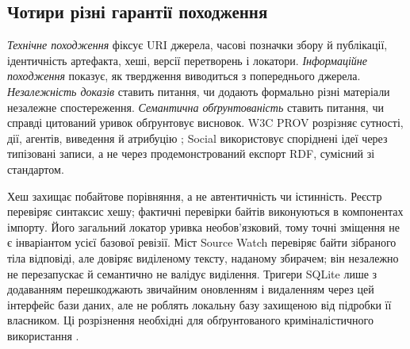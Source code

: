 \subsection{Чотири різні гарантії походження}
\emph{Технічне походження} фіксує URI джерела, часові позначки збору й публікації, ідентичність артефакта, хеші, версії перетворень і локатори. \emph{Інформаційне походження} показує, як твердження виводиться з попереднього джерела. \emph{Незалежність доказів} ставить питання, чи додають формально різні матеріали незалежне спостереження. \emph{Семантична обґрунтованість} ставить питання, чи справді цитований уривок обґрунтовує висновок. W3C PROV розрізняє сутності, дії, агентів, виведення й атрибуцію \citep{lebo2013provo,moreau2013provdm}; Social використовує споріднені ідеї через типізовані записи, а не через продемонстрований експорт RDF, сумісний зі стандартом.

Хеш захищає побайтове порівняння, а не автентичність чи істинність. Реєстр перевіряє синтаксис хешу; фактичні перевірки байтів виконуються в компонентах імпорту. Його загальний локатор уривка необов'язковий, тому точні зміщення не є інваріантом усієї базової ревізії. Міст Source Watch перевіряє байти зібраного тіла відповіді, але довіряє виділеному тексту, наданому збирачем; він незалежно не перезапускає й семантично не валідує виділення. Тригери SQLite лише з додаванням перешкоджають звичайним оновленням і видаленням через цей інтерфейс бази даних, але не роблять локальну базу захищеною від підробки її власником. Ці розрізнення необхідні для обґрунтованого криміналістичного використання \citep{berkeleyProtocol2022}.
